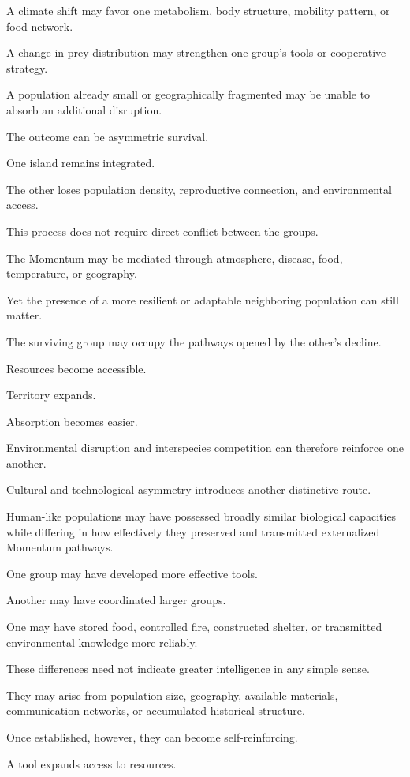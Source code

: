 A climate shift may favor one metabolism, body structure, mobility pattern, or food network.

A change in prey distribution may strengthen one group’s tools or cooperative strategy.

A population already small or geographically fragmented may be unable to absorb an additional disruption.

The outcome can be asymmetric survival.

One island remains integrated.

The other loses population density, reproductive connection, and environmental access.

This process does not require direct conflict between the groups.

The Momentum may be mediated through atmosphere, disease, food, temperature, or geography.

Yet the presence of a more resilient or adaptable neighboring population can still matter.

The surviving group may occupy the pathways opened by the other’s decline.

Resources become accessible.

Territory expands.

Absorption becomes easier.

Environmental disruption and interspecies competition can therefore reinforce one another.

Cultural and technological asymmetry introduces another distinctive route.

Human-like populations may have possessed broadly similar biological capacities while differing in how effectively they preserved and transmitted externalized Momentum pathways.

One group may have developed more effective tools.

Another may have coordinated larger groups.

One may have stored food, controlled fire, constructed shelter, or transmitted environmental knowledge more reliably.

These differences need not indicate greater intelligence in any simple sense.

They may arise from population size, geography, available materials, communication networks, or accumulated historical structure.

Once established, however, they can become self-reinforcing.

A tool expands access to resources.

